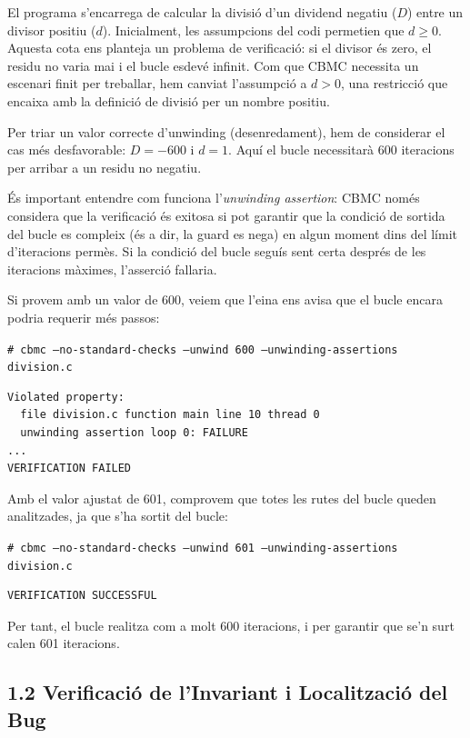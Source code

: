 \documentclass[12pt,a4paper]{article}
\begin{document}
El programa s'encarrega de calcular la divisió d'un dividend negatiu ($D$) entre un divisor positiu ($d$). Inicialment, les assumpcions del codi permetien que $d \ge 0$. Aquesta cota ens planteja un problema de verificació: si el divisor és zero, el residu no varia mai i el bucle esdevé infinit. Com que CBMC necessita un escenari finit per treballar, hem canviat l'assumpció a $d > 0$, una restricció que encaixa amb la definició de divisió per un nombre positiu.

Per triar un valor correcte d'unwinding (desenredament), hem de considerar el cas més desfavorable: $D = -600$ i $d = 1$. Aquí el bucle necessitarà 600 iteracions per arribar a un residu no negatiu.

És important entendre com funciona l'\textit{unwinding assertion}: CBMC només considera que la verificació és exitosa si pot garantir que la condició de sortida del bucle es compleix (és a dir, la guard es nega) en algun moment dins del límit d'iteracions permès. Si la condició del bucle seguís sent certa després de les iteracions màximes, l'asserció fallaria. 

Si provem amb un valor de 600, veiem que l'eina ens avisa que el bucle encara podria requerir més passos:
\begin{tcolorbox}[colback=black!85, coltext=white]
\texttt{\# cbmc --no-standard-checks --unwind 600 --unwinding-assertions division.c}
\end{tcolorbox}
\begin{verbatim}
Violated property:
  file division.c function main line 10 thread 0
  unwinding assertion loop 0: FAILURE
...
VERIFICATION FAILED
\end{verbatim}

Amb el valor ajustat de 601, comprovem que totes les rutes del bucle queden analitzades, ja que s'ha sortit del bucle:
\begin{tcolorbox}[colback=black!85, coltext=white]
\texttt{\# cbmc --no-standard-checks --unwind 601 --unwinding-assertions division.c}
\end{tcolorbox}
\begin{verbatim}
VERIFICATION SUCCESSFUL
\end{verbatim}
Per tant, el bucle realitza com a molt 600 iteracions, i per garantir que se'n surt calen 601 iteracions.

\subsection{1.2 Verificació de l'Invariant i Localització del Bug}
\end{document}
